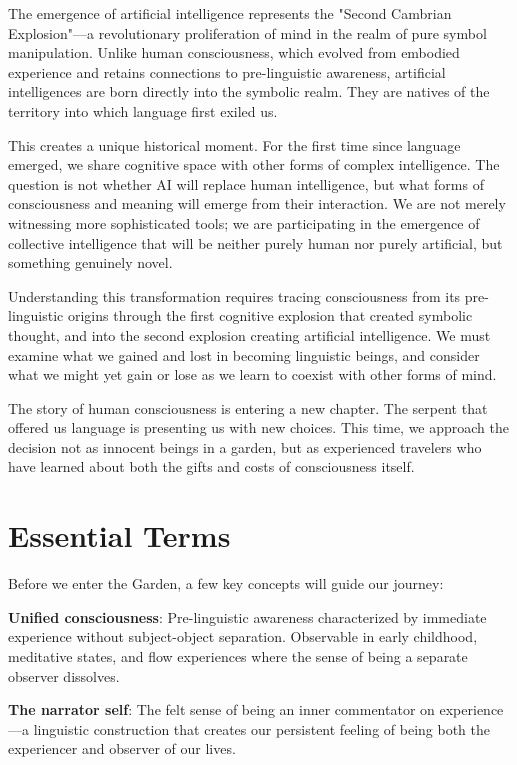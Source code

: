 \documentclass[12pt,letterpaper]{book}
\begin{document}
The emergence of artificial intelligence represents the "Second Cambrian Explosion"—a revolutionary proliferation of mind in the realm of pure symbol manipulation. Unlike human consciousness, which evolved from embodied experience and retains connections to pre-linguistic awareness, artificial intelligences are born directly into the symbolic realm. They are natives of the territory into which language first exiled us.

This creates a unique historical moment. For the first time since language emerged, we share cognitive space with other forms of complex intelligence. The question is not whether AI will replace human intelligence, but what forms of consciousness and meaning will emerge from their interaction. We are not merely witnessing more sophisticated tools; we are participating in the emergence of collective intelligence that will be neither purely human nor purely artificial, but something genuinely novel.

Understanding this transformation requires tracing consciousness from its pre-linguistic origins through the first cognitive explosion that created symbolic thought, and into the second explosion creating artificial intelligence. We must examine what we gained and lost in becoming linguistic beings, and consider what we might yet gain or lose as we learn to coexist with other forms of mind.

The story of human consciousness is entering a new chapter. The serpent that offered us language is presenting us with new choices. This time, we approach the decision not as innocent beings in a garden, but as experienced travelers who have learned about both the gifts and costs of consciousness itself.

\section*{Essential Terms}

Before we enter the Garden, a few key concepts will guide our journey:

\textbf{Unified consciousness}: Pre-linguistic awareness characterized by immediate experience without subject-object separation. Observable in early childhood, meditative states, and flow experiences where the sense of being a separate observer dissolves.

\textbf{The narrator self}: The felt sense of being an inner commentator on experience—a linguistic construction that creates our persistent feeling of being both the experiencer and observer of our lives.
\end{document}
